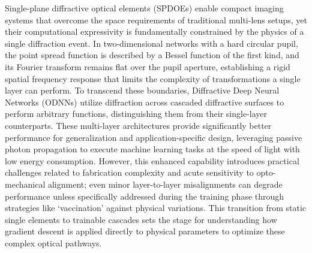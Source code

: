 Single-plane diffractive optical elements (SPDOEs) enable compact imaging systems that overcome the space requirements of traditional multi-lens setups, yet their computational expressivity is fundamentally constrained by the physics of a single diffraction event. In two-dimensional networks with a hard circular pupil, the point spread function is described by a Bessel function of the first kind, and its Fourier transform remains flat over the pupil aperture, establishing a rigid spatial frequency response that limits the complexity of transformations a single layer can perform. To transcend these boundaries, Diffractive Deep Neural Networks (ODNNs) utilize diffraction across cascaded diffractive surfaces to perform arbitrary functions, distinguishing them from their single-layer counterparts. \citep{doi_10_1186_s43593_025_00113_w_ca9e8e1e} These multi-layer architectures provide significantly better performance for generalization and application-specific design, leveraging passive photon propagation to execute machine learning tasks at the speed of light with low energy consumption. However, this enhanced capability introduces practical challenges related to fabrication complexity and acute sensitivity to opto-mechanical alignment; even minor layer-to-layer misalignments can degrade performance unless specifically addressed during the training phase through strategies like `vaccination' against physical variations. This transition from static single elements to trainable cascades sets the stage for understanding how gradient descent is applied directly to physical parameters to optimize these complex optical pathways. \citep{s2_7caf7c29ac69aa12038f926409fb469f65ebeb2a_e9ce584d} \citep{doi_10_1364_oe_579297_3ffb4db0} \citep{doi_10_1364_oe_446890_26d35f03} \citep{doi_10_1515_nanoph_2020_0291_c4a9f42d} \citep{doi_10_1364_optica_576204_30060082}


